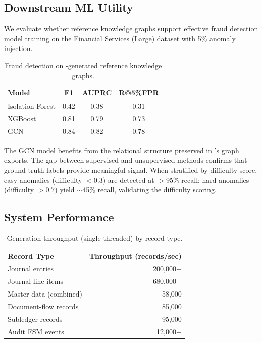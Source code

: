 \subsection{Downstream ML Utility}
\label{sec:exp_ml}

We evaluate whether reference knowledge graphs support effective fraud
detection model training on the Financial Services (Large) dataset
with 5\% anomaly injection.

\begin{table}[t]
\centering
\caption{Fraud detection on \system{}-generated reference knowledge graphs.}
\label{tab:ml_results}
\small
\begin{tabular}{lccc}
\toprule
\textbf{Model} & \textbf{F1} & \textbf{AUPRC} & \textbf{R@5\%FPR} \\
\midrule
Isolation Forest   & 0.42 & 0.38 & 0.31 \\
XGBoost            & 0.81 & 0.79 & 0.73 \\
GCN                & 0.84 & 0.82 & 0.78 \\
\bottomrule
\end{tabular}
\end{table}

The GCN model benefits from the relational structure preserved in
\system{}'s graph exports.  The gap between supervised and unsupervised
methods confirms that ground-truth labels provide meaningful signal.
When stratified by difficulty score, easy anomalies (difficulty $< 0.3$)
are detected at $>$95\% recall; hard anomalies (difficulty $> 0.7$)
yield $\sim$45\% recall, validating the difficulty scoring.

\subsection{System Performance}
\label{sec:exp_performance}

\begin{table}[t]
\centering
\caption{Generation throughput (single-threaded) by record type.}
\label{tab:throughput}
\small
\begin{tabular}{lr}
\toprule
\textbf{Record Type} & \textbf{Throughput (records/sec)} \\
\midrule
Journal entries           & 200{,}000+ \\
Journal line items        & 680{,}000+ \\
Master data (combined)    & 58{,}000 \\
Document-flow records     & 85{,}000 \\
Subledger records         & 95{,}000 \\
Audit FSM events          & 12{,}000+ \\
\bottomrule
\end{tabular}
\end{table}


